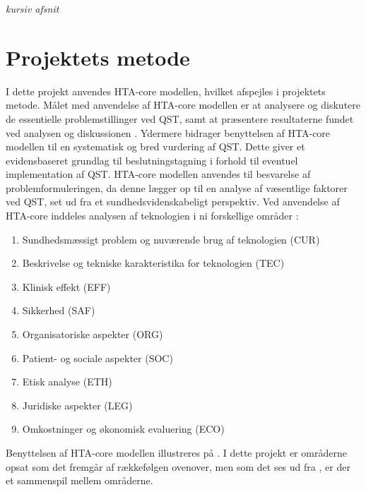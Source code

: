 \textit{kursiv afsnit}

\section{Projektets metode}
I dette projekt anvendes HTA-core modellen, hvilket afspejles i projektets metode. Målet med anvendelse af HTA-core modellen er at analysere og diskutere de essentielle problemstillinger ved QST, samt at præsentere resultaterne fundet ved analysen og diskussionen \citep{HTAcore}. Ydermere bidrager benyttelsen af HTA-core modellen til en systematisk og bred vurdering af QST. Dette giver et evidensbaseret grundlag til beslutningstagning i forhold til eventuel implementation af QST. \citep{metodehaandbogen} \citep{HTAcore} HTA-core modellen anvendes til besvarelse af problemformuleringen, da denne lægger op til en analyse af væsentlige faktorer ved QST, set ud fra et sundhedsvidenskabeligt perspektiv. Ved anvendelse af HTA-core inddeles analysen af teknologien i ni forskellige områder \citep{HTAcore}:

\begin{enumerate}
\item Sundhedsmæssigt problem og nuværende brug af teknologien (CUR)
\item Beskrivelse og tekniske karakteristika for teknologien (TEC)
\item Klinisk effekt (EFF)
\item Sikkerhed (SAF)
\item Organisatoriske aspekter (ORG)
\item Patient- og sociale aspekter (SOC)
\item Etisk analyse (ETH)
\item Juridiske aspekter (LEG)
\item Omkostninger og økonomisk evaluering (ECO)
\end{enumerate}

Benyttelsen af HTA-core modellen illustreres på . I dette projekt er områderne opsat som det fremgår af rækkefølgen ovenover, men som det ses ud fra , er der et sammenspil mellem områderne. 

